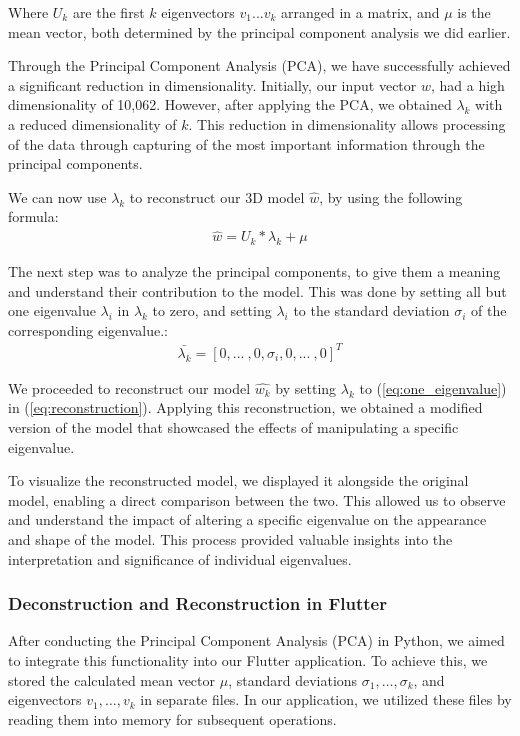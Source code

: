 Where $U_k$ are the first $k$ eigenvectors $v_1...v_k$ arranged in a matrix, and $\mu$ is the mean vector, both determined by the principal component analysis we did earlier. 

Through the Principal Component Analysis (PCA), we have successfully achieved a significant reduction in dimensionality. Initially, our input vector $w$, had a high dimensionality of 10,062. 
However, after applying the PCA, we obtained $\lambda_k$ with a reduced dimensionality of $k$. This reduction in dimensionality allows processing of the data through capturing of the most important 
information through the principal components.

We can now use $\lambda_k$ to reconstruct our 3D model $\hat{w}$, by using the following formula:
\begin{align}\label{eq:reconstruction}
    \hat{w} = U_k * \lambda_k + \mu
\end{align}


The next step was to analyze the principal components, to give them a meaning and understand their contribution to the model. This was done by setting all but one eigenvalue $\lambda_i$ in $\lambda_k$ to zero,
and setting $\lambda_i$ to the standard deviation $\sigma_i$ of the corresponding eigenvalue.:
\begin{align}\label{eq:one_eigenvalue}
    \bar{\lambda_k} = [0, ...\ , 0, \sigma_i, 0,...\ ,0]^T
\end{align}

We proceeded to reconstruct our model $\hat{w_k}$ by setting $\lambda_k$ to (\ref{eq:one_eigenvalue}) in (\ref{eq:reconstruction}). Applying this reconstruction, we obtained a modified version of the model 
that showcased the effects of manipulating a specific eigenvalue.

To visualize the reconstructed model, we displayed it alongside the original model, enabling a direct comparison between the two. This allowed us to observe and understand the impact 
of altering a specific eigenvalue on the appearance and shape of the model. This process provided valuable insights into the interpretation and significance of individual eigenvalues.

\subsubsection{Deconstruction and Reconstruction in Flutter}

After conducting the Principal Component Analysis (PCA) in Python, we aimed to integrate this functionality into our Flutter application. To achieve this, we stored the calculated mean vector $\mu$, 
standard deviations $\sigma_1, \ldots, \sigma_k$, and eigenvectors $v_1, \ldots, v_k$ in separate files. In our application, we utilized these files by reading them into memory for subsequent operations.

